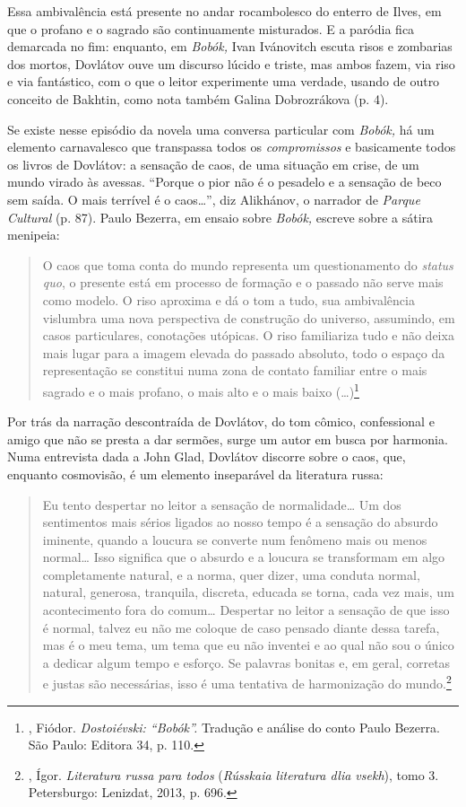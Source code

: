 Essa ambivalência está presente no andar rocambolesco do enterro de
Ilves, em que o profano e o sagrado são continuamente misturados. E a
paródia fica demarcada no fim: enquanto, em \emph{Bobók,} Ivan
Ivánovitch escuta risos e zombarias dos mortos, Dovlátov ouve um
discurso lúcido e triste, mas ambos fazem, via riso e via fantástico,
com o que o leitor experimente uma verdade, usando de outro conceito de
Bakhtin, como nota também Galina Dobrozrákova (p. 4).

Se existe nesse episódio da novela uma conversa particular com
\emph{Bobók,} há um elemento carnavalesco que transpassa todos os
\emph{compromissos} e basicamente todos os livros de Dovlátov: a
sensação de caos, de uma situação em crise, de um mundo virado às
avessas. ``Porque o pior não
é o pesadelo e a sensação de beco sem saída. O mais terrível é o
caos\ldots{}'', diz Alikhánov, o narrador de \emph{Parque Cultural} (p. 87).
Paulo Bezerra, em ensaio sobre \emph{Bobók,} escreve sobre a sátira
menipeia:

\begin{quotation}
O caos que toma conta do mundo representa um questionamento do
\emph{status quo}, o presente está em processo de formação e o passado
não serve mais como modelo. O riso aproxima e dá o tom a tudo, sua
ambivalência vislumbra uma nova perspectiva de construção do universo,
assumindo, em casos particulares, conotações utópicas. O riso
familiariza tudo e não deixa mais lugar para a imagem elevada do passado
absoluto, todo o espaço da representação se constitui numa zona de
contato familiar entre o mais sagrado e o mais profano, o mais alto e o
mais baixo (\ldots{})\footnote{, Fiódor. \emph{Dostoiévski:
  ``Bobók''.} Tradução e análise do conto Paulo Bezerra. São Paulo:
  Editora 34, p. 110.}
\end{quotation}

Por trás da narração descontraída de Dovlátov, do tom cômico,
confessional e amigo que não se presta a dar sermões, surge um autor em
busca por harmonia. Numa entrevista dada a John Glad, Dovlátov discorre
sobre o caos, que, enquanto cosmovisão, é um elemento inseparável da
literatura russa:

\begin{quotation}
Eu tento despertar no leitor a sensação de normalidade\ldots{} Um dos
sentimentos mais sérios ligados ao nosso tempo é a sensação do absurdo
iminente, quando a loucura se converte num fenômeno mais ou menos
normal\ldots{} Isso significa que o absurdo e a loucura se transformam em
algo completamente natural, e a norma, quer dizer, uma conduta normal,
natural, generosa, tranquila, discreta, educada se torna, cada vez mais,
um acontecimento fora do comum\ldots{} Despertar no leitor a sensação de que
isso é normal, talvez eu não me coloque de caso pensado diante dessa
tarefa, mas é o meu tema, um tema que eu não inventei e ao qual não sou
o único a dedicar algum tempo e esforço. Se palavras bonitas e, em
geral, corretas e justas são necessárias, isso é uma tentativa de
harmonização do mundo.\footnote{, Ígor. \emph{Literatura russa
  para todos} (\emph{Rússkaia literatura dlia vsekh}), tomo 3.
  Petersburgo: Lenizdat, 2013, p. 696.}
\end{quotation}

